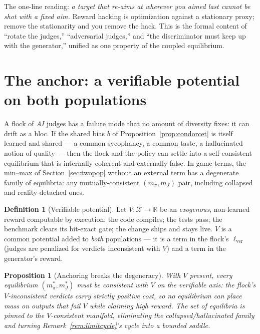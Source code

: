 \documentclass[11pt]{article}
\newtheorem{proposition}{Proposition}
\theoremstyle{definition}
\newtheorem{definition}{Definition}
\theoremstyle{remark}
\newcommand{\R}{\mathbb{R}}
\newcommand{\mpi}{m_{\pi}}
\newcommand{\mJ}{m_{J}}
\newcommand{\Xspace}{\mathcal{X}}
\begin{document}
The one-line reading: \emph{a target that re-aims at wherever you aimed last cannot be shot with a fixed
aim.} Reward hacking is optimization against a stationary proxy; remove the stationarity and you remove the
hack. This is the formal content of ``rotate the judges,'' ``adversarial judges,'' and ``the discriminator
must keep up with the generator,'' unified as one property of the coupled equilibrium.

\section{The anchor: a verifiable potential on both populations}
\label{sec:anchor}

A flock of \emph{AI} judges has a failure mode that no amount of diversity fixes: it can drift as a bloc.
If the shared bias $b$ of Proposition~\ref{prop:condorcet} is itself learned and shared --- a common
sycophancy, a common taste, a hallucinated notion of quality --- then the flock and the policy can settle
into a self-consistent equilibrium that is internally coherent and externally false. In game terms, the
min--max of Section~\ref{sec:twopop} without an external term has a degenerate family of equilibria: any
mutually-consistent $(\mpi,\mJ)$ pair, including collapsed and reality-detached ones.

\begin{definition}[Verifiable potential]
Let $V:\Xspace\to\R$ be an \emph{exogenous}, non-learned reward computable by execution: the code compiles;
the tests pass; the benchmark clears its bit-exact gate; the change ships and stays live. $V$ is a common
potential added to \emph{both} populations --- it is a term in the flock's $\ell_{\text{ver}}$ (judges are
penalized for verdicts inconsistent with $V$) and a term in the generator's reward.
\end{definition}

\begin{proposition}[Anchoring breaks the degeneracy]
\label{prop:anchor}
With $V$ present, every equilibrium $(\mpi^\ast,\mJ^\ast)$ must be consistent with $V$ on the verifiable
axis: the flock's $V$-inconsistent verdicts carry strictly positive cost, so no equilibrium can place mass
on outputs that fail $V$ while claiming high reward. The set of equilibria is pinned to the
$V$-consistent manifold, eliminating the collapsed/hallucinated family and turning
Remark~\ref{rem:limitcycle}'s cycle into a bounded saddle.
\end{proposition}
\end{document}
